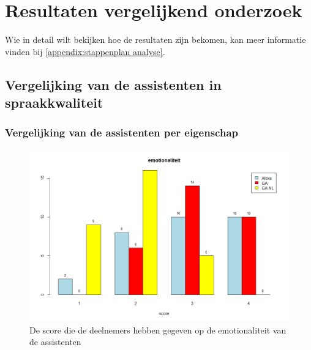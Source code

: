
\chapter{Resultaten vergelijkend onderzoek}
\label{ch:resultaten}
Wie in detail wilt bekijken hoe de resultaten zijn bekomen, kan meer informatie vinden bij \ref{appendix:stappenplan analyse}.

\section{Vergelijking van de assistenten in spraakkwaliteit}
\label{s:Vergelijking van de assistenten in spraakkwaliteit}

\subsection{Vergelijking van de assistenten per eigenschap}
\label{ss:Vergelijking van de assistenten per eigenschap}

\begin{figure}[H]
    \centering
    \includegraphics[width=0.9\linewidth]{../onderzoek/onderzoeksresultaten/vergelijking_assistenten_per_eigenschap/barplot/barplot_score_emotionaliteit}
    \caption{De score die de deelnemers hebben gegeven op de emotionaliteit van de assistenten}
    \label{fig:barplot-emotionaliteit}
\end{figure}

